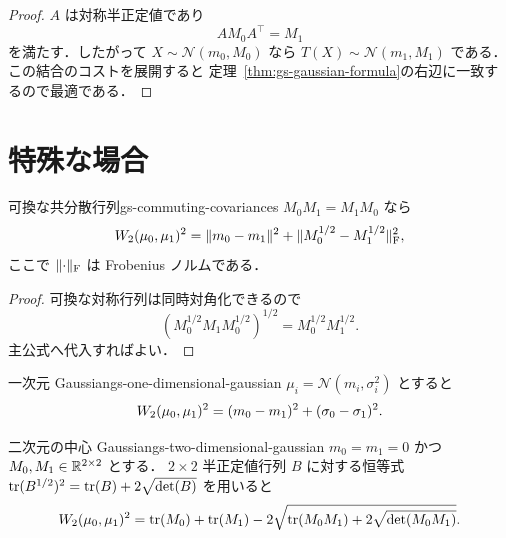 \begin{proof}
  $A$ は対称半正定値であり
  \[
    AM_0A^\top=M_1
  \]
  を満たす．したがって $X\sim\mathcal{N}(m_0,M_0)$ なら
  $T(X)\sim\mathcal{N}(m_1,M_1)$ である．
  この結合のコストを展開すると
  定理~\ref{thm:gs-gaussian-formula}の右辺に一致するので最適である．
\end{proof}

\section{特殊な場合}
\label{sec:gaussian-special-cases}

\begin{proposition}{可換な共分散行列}{gs-commuting-covariances}
  $M_0M_1=M_1M_0$ なら
  \[
    W_2(\mu_0,\mu_1)^2
    =
    \lVert m_0-m_1 \rVert^2
    +
    \lVert M_0^{1/2}-M_1^{1/2} \rVert_{\mathrm{F}}^2,
  \]
  ここで $\lVert \cdot \rVert_{\mathrm{F}}$ は Frobenius ノルムである．
\end{proposition}

\begin{proof}
  可換な対称行列は同時対角化できるので
  \[
    \left(
      M_0^{1/2}M_1M_0^{1/2}
    \right)^{1/2}
    =
    M_0^{1/2}M_1^{1/2}.
  \]
  主公式へ代入すればよい．
\end{proof}

\begin{example}{一次元 Gaussian}{gs-one-dimensional-gaussian}
  $\mu_i=\mathcal{N}(m_i,\sigma_i^2)$ とすると
  \[
    W_2(\mu_0,\mu_1)^2
    =
    (m_0-m_1)^2+(\sigma_0-\sigma_1)^2.
  \]
\end{example}

\begin{example}{二次元の中心 Gaussian}{gs-two-dimensional-gaussian}
  $m_0=m_1=0$ かつ $M_0,M_1\in\mathbb{R}^{2\times2}$ とする．
  $2\times2$ 半正定値行列 $B$ に対する恒等式
  $\operatorname{tr}(B^{1/2})^2=\operatorname{tr}(B)+2\sqrt{\det(B)}$ を用いると
  \[
    W_2(\mu_0,\mu_1)^2
    =
    \operatorname{tr}(M_0)+\operatorname{tr}(M_1)
    -2\sqrt{
      \operatorname{tr}(M_0M_1)
      +2\sqrt{\det(M_0M_1)}
    }.
  \]
\end{example}
